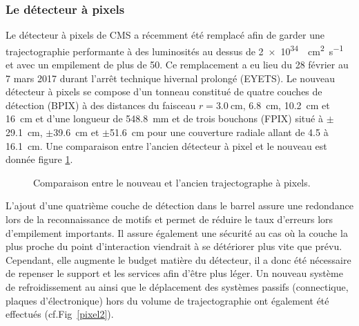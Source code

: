 \subsubsection{Le détecteur à pixels}
Le détecteur à pixels de CMS a récemment été remplacé afin de garder une trajectographie performante à des luminosités au dessus de \SI{2e34}{\per\square\centi\meter\per\second} et avec un empilement de plus de \num{50}. Ce remplacement a eu lieu du \num{28} février au \num{7} mars \num{2017} durant l'arrêt technique hivernal prolongé (EYETS). Le nouveau détecteur à pixels se compose d'un tonneau constitué de quatre couches de détection (BPIX) à des distances du faisceau $r=\SI{3.0}{\centi\meter}$, \SI{6.8}{\centi\meter}, \SI{10.2}{\centi\meter} et \SI{16}{\centi\meter} et d'une longueur de \SI{548.8}{\milli\meter} et de trois bouchons (FPIX) situé à $\pm$\SI{29.1}{\centi\meter}, $\pm$\SI{39.6}{\centi\meter} et $\pm$\SI{51.6}{\centi\meter} pour une couverture radiale allant de \num{4.5} à \SI{16.1}{\centi\meter}. Une comparaison entre l'ancien détecteur à pixel et le nouveau est donnée figure \ref{pixel}.

	\begin{figure}[ht!]
	\hfill
	\caption{Comparaison entre le nouveau et l'ancien trajectographe à pixels.}
	\label{pixel}
\end{figure}

L'ajout d'une quatrième couche de détection dans le barrel assure une redondance lors de la reconnaissance de motifs et permet de réduire le taux d'erreurs lors d'empilement importants. Il assure également une sécurité au cas où la couche la plus proche du point d'interaction viendrait à se détériorer plus vite que prévu. Cependant, elle augmente le budget matière du détecteur, il a donc été nécessaire de repenser le support et les services afin d'être plus léger. Un nouveau système de refroidissement au  ainsi que le déplacement des systèmes passifs (connectique, plaques d'électronique) hors du volume de trajectographie ont également été effectués (cf.Fig~\ref{pixel2}).

